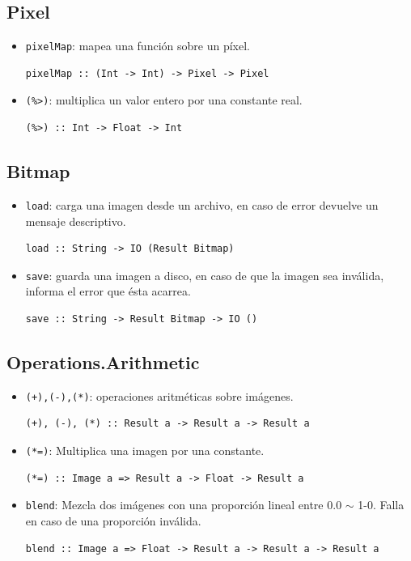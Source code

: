 \documentclass[a4paper, 11pt]{article} %
\begin{document}
	
\subsection*{Pixel}
	\begin{itemize} 
		\item \texttt{pixelMap}: mapea una función sobre un píxel.
\begin{lstlisting}
pixelMap :: (Int -> Int) -> Pixel -> Pixel
\end{lstlisting}
		\item \texttt{(\%>)}: multiplica un valor entero por una constante real.
\begin{lstlisting} 
(%>) :: Int -> Float -> Int
\end{lstlisting}
	\end{itemize}

	
\subsection*{Bitmap}
	\begin{itemize} 
		\item \texttt{load}: carga una imagen desde un archivo, en caso de error devuelve un mensaje descriptivo.
\begin{lstlisting}
load :: String -> IO (Result Bitmap)
\end{lstlisting}
		\item \texttt{save}: guarda una imagen a disco, en caso de que la imagen sea inválida, informa el error que ésta acarrea.
\begin{lstlisting} 
save :: String -> Result Bitmap -> IO ()
\end{lstlisting}
	\end{itemize}
	

\subsection*{Operations.Arithmetic}
	\begin{itemize} 
		\item \texttt{(+),(-),(*)}: operaciones aritméticas sobre imágenes.
\begin{lstlisting}
(+), (-), (*) :: Result a -> Result a -> Result a
\end{lstlisting}
		\item \texttt{(*=)}: Multiplica una imagen por una constante.
\begin{lstlisting}
(*=) :: Image a => Result a -> Float -> Result a
\end{lstlisting}
		\item \texttt{blend}: Mezcla dos imágenes con una proporción lineal entre 0.0 $\sim$ 1-0. Falla en caso de una proporción inválida.
\begin{lstlisting}
blend :: Image a => Float -> Result a -> Result a -> Result a
\end{lstlisting}

	\end{itemize}
	
\end{document}
